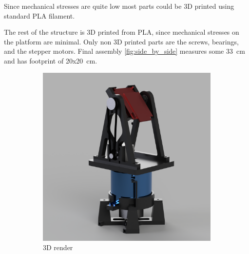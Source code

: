 Since mechanical stresses are quite low most parts could be 3D printed using standard PLA filament.

The rest of the structure is 3D printed from PLA, since mechanical stresses on the platform are minimal.
Only non 3D printed parts are the screws, bearings, and the stepper motors.
Final assembly \ref{fig:side_by_side} measures some 33~cm and has footprint of 20x20~cm.


\begin{figure}[h!]
  \centering
  \begin{subfigure}[b]{0.45\textwidth}
    \centering
    \includegraphics[width=\textwidth]{../img/whole_assembly_2.png} %
    \caption{3D render}
  \end{subfigure}
  \hspace{0.05\textwidth} %
  \begin{subfigure}[b]{0.45\textwidth}
    \centering

\end{subfigure}
\end{figure}

